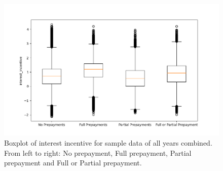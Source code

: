     \begin{figure}[H]
        \centering
        \includegraphics[width=\linewidth]{Figures/Boxplots_interest_incentive.png}
        \caption{
            Boxplot of interest incentive for sample data of all years combined. From 
            left to right: No prepayment, Full prepayment, Partial 
            prepayment and Full or Partial prepayment.}
        \label{boxplots_incentive}
    \end{figure}
        

